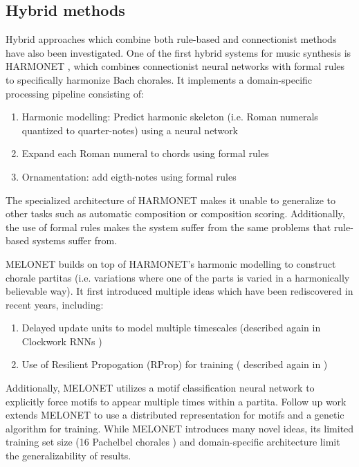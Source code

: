 \documentclass[dissertation.tex]{subfiles}
\begin{document}
\subsection{Hybrid methods}

Hybrid approaches which combine both rule-based and connectionist methods have
also been investigated. One of the first hybrid systems for music synthesis is
HARMONET \cite{hild1991harmonet}, which combines connectionist neural networks
with formal rules to specifically harmonize Bach chorales. It implements a
domain-specific processing pipeline consisting of:
\begin{enumerate}
  \item Harmonic modelling: Predict harmonic skeleton (i.e. Roman numerals
  quantized to quarter-notes) using a neural network
  \item Expand each Roman numeral to chords using formal rules
  \item Ornamentation: add eigth-notes using formal rules
\end{enumerate}
The specialized architecture of HARMONET makes it unable to generalize
to other tasks such as automatic composition or composition scoring.
Additionally, the use of formal rules makes the system suffer from the same
problems that rule-based systems suffer from.

MELONET \cite{feulner1994melonet} builds on top of HARMONET's harmonic
modelling to construct chorale partitas (i.e. variations where one of the
parts is varied in a harmonically believable way). It first introduced multiple
ideas which have been rediscovered in recent years, including:
\begin{enumerate}
  \item Delayed update units to model multiple timescales (described again in Clockwork
  RNNs \cite{Koutnik2014})
  \item Use of Resilient Propogation (RProp) \cite{riedmiller1993direct} for training (
  described again in \cite{Liu2014})
\end{enumerate}
Additionally, MELONET utilizes a motif classification neural network to
explicitly force motifs to appear multiple times within a partita.
Follow up work \cite{hornel1996learning} extends MELONET to use a distributed
representation for motifs and a genetic algorithm for training.
While MELONET introduces many novel ideas, its limited training set size
(16 Pachelbel chorales \cite{hornel1997melonet}) and domain-specific
architecture limit the generalizability of results. 
\end{document}
